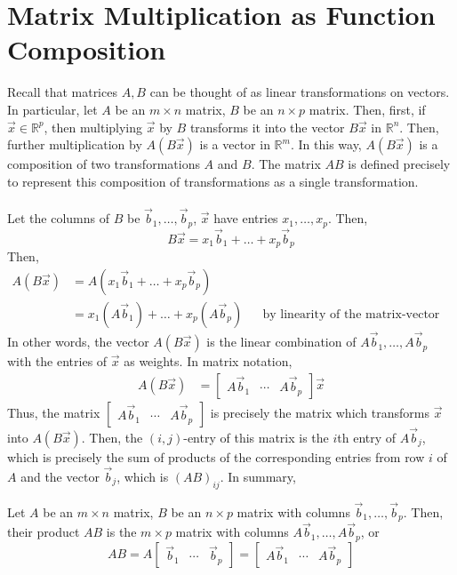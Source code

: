 \documentclass[letterpaper,12pt]{article}
\begin{document}
\section*{Matrix Multiplication as Function Composition}
Recall that matrices $A, B$ can be thought of as linear transformations on vectors. In particular, let $A$ be an $m \times n$ matrix, $B$ be an $n \times p$ matrix. Then, first, if $\vec{x} \in \mathbb{R}^p$, then multiplying $\vec{x}$ by $B$ transforms it into the vector $B \vec{x}$ in $\mathbb{R}^n$. Then, further multiplication by $A(B\vec{x})$ is a vector in $\mathbb{R}^m$. In this way, $A(B\vec{x})$ is a composition of two transformations $A$ and $B$. The matrix $AB$ is defined precisely to represent this composition of transformations as a single transformation.
\\ \\ Let the columns of $B$ be $\vec{b}_1, \dots, \vec{b}_p$, $\vec{x}$ have entries $x_1, \dots, x_p$. Then,
\begin{equation*}
    B\vec{x} = x_1 \vec{b}_1 + \dots + x_p \vec{b}_p
\end{equation*}
Then,
\begin{align*}
    A(B\vec{x}) & = A(x_1 \vec{b}_1 + \dots + x_p \vec{b}_p) \\
    & = x_1 (A\vec{b}_1) + \dots + x_p (A\vec{b}_p) && \text{by linearity of the matrix-vector product}
\end{align*}
In other words, the vector $A(B\vec{x})$ is the linear combination of $A\vec{b}_1, \dots, A\vec{b}_p$ with the entries of $\vec{x}$ as weights. In matrix notation,
\begin{align*}
    A(B\vec{x}) & = \begin{bmatrix} A \vec{b}_1 & \cdots & A \vec{b}_p \end{bmatrix} \vec{x}
\end{align*}
Thus, the matrix $\begin{bmatrix} A \vec{b}_1 & \cdots & A \vec{b}_p \end{bmatrix}$ is precisely the matrix which transforms $\vec{x}$ into $A(B\vec{x})$. Then, the $(i,j)$-entry of this matrix is the $i$th entry of $A\vec{b}_j$, which is precisely the sum of products of the corresponding entries from row $i$ of $A$ and the vector $\vec{b}_j$, which is $(AB)_{ij}$. In summary,

\begin{theorem}
Let $A$ be an $m \times n$ matrix, $B$ be an $n \times p$ matrix with columns $\vec{b}_1, \dots, \vec{b}_p$. Then, their product $AB$ is the $m \times p$ matrix with columns $A\vec{b}_1, \dots, A\vec{b}_p$, or
\begin{equation*}
    \boxed{AB = A \begin{bmatrix} \vec{b}_1 & \cdots & \vec{b}_p \end{bmatrix} = \begin{bmatrix} A \vec{b}_1 & \cdots & A \vec{b}_p \end{bmatrix}}
\end{equation*}
\end{theorem}
\end{document}
